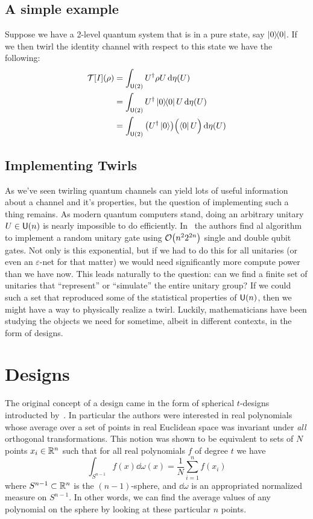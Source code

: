 \documentclass[11pt,english]{article}
\theoremstyle{definition}
\begin{document}
\subsection{A simple example}
Suppose we have a 2-level quantum system that is in a pure state, say $\ketbra{0}$.
If we then twirl the identity channel with respect to this state we have the following:
\begin{align}
  \mathcal{T}[I](\rho) & = \int_{\mathsf{U}(2)}U^\dagger\rho U\dd{\eta(U)}                          \\
                       & = \int_{\mathsf{U}(2)}U^\dagger\ketbra{0}U\dd{\eta(U)}                     \\
                       & = \int_{\mathsf{U}(2)}\qty(U^\dagger\ket{0})\qty\Big(\bra{0}U)\dd{\eta(U)}
\end{align}

\subsection{Implementing Twirls}

As we've seen twirling quantum channels can yield lots of useful information about a channel and it's properties, but the question of implementing such a thing remains.
As modern quantum computers stand, doing an arbitrary unitary $U\in\mathsf{U}(n)$ is nearly impossible to do efficiently.
In~\cite{pseudo-random} the authors find al algorithm to implement a random unitary gate using $\order{n^2 2^{2n}}$ single and double qubit gates.
Not only is this exponential, but if we had to do this for all unitaries (or even an $\varepsilon$-net for that matter) we would need significantly more compute power than we have now.
This leads naturally to the question: can we find a finite set of unitaries that ``represent'' or ``simulate'' the entire unitary group?
If we could such a set that reproduced some of the statistical properties of $\mathsf{U}(n)$, then we might have a way to physically realize a twirl.
Luckily, mathematicians have been studying the objects we need for sometime, albeit in different contexts, in the form of designs.

\section{Designs}

The original concept of a design came in the form of spherical $t$-designs introducted by~\cite{spherical-designs}.
In particular the authors were interested in real polynomials whose average over a set of points in real Euclidean space was invariant under \emph{all} orthogonal transformations.
This notion was shown to be equivalent to sets of $N$ points $x_i\in\mathbb{R}^n$ such that for all real polynomials $f$ of degree $t$ we have
\begin{equation}
  \int_{S^{n-1}} f(x)\dd{\omega(x)} = \frac{1}{N}\sum_{i = 1}^n f(x_i)
\end{equation}
where $S^{n-1}\subset \mathbb{R}^n$ is the $(n-1)$-sphere, and $\dd{\omega}$ is an appropriated normalized measure on $S^{n-1}$.
In other words, we can find the average values of any polynomial on the sphere by looking at these particular $n$ points.
\end{document}
